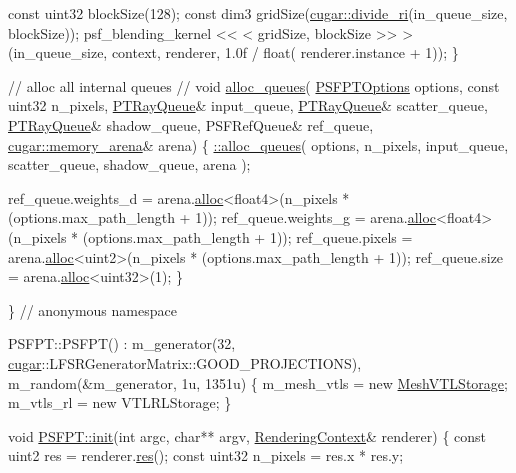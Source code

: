 \begin{DoxyCodeInclude}
        \textcolor{keyword}{const} uint32 blockSize(128);
        \textcolor{keyword}{const} dim3 gridSize(\hyperlink{group___basic_utils_gabb6714186dbbd864f0a9298944ba509b}{cugar::divide\_ri}(in\_queue\_size, blockSize));
        psf\_blending\_kernel << < gridSize, blockSize >> > (in\_queue\_size, context, renderer, 1.0f / float(
      renderer.instance + 1));
    \}

    \textcolor{comment}{// alloc all internal queues}
    \textcolor{comment}{//}
    \textcolor{keywordtype}{void} \hyperlink{group___p_t_lib_gaf8daef8b815f7712ff692edbaa628881}{alloc\_queues}(
        \hyperlink{struct_p_s_f_p_t_options}{PSFPTOptions}            options,
        \textcolor{keyword}{const} uint32            n\_pixels,
        \hyperlink{struct_p_t_ray_queue}{PTRayQueue}&               input\_queue,
        \hyperlink{struct_p_t_ray_queue}{PTRayQueue}&               scatter\_queue,
        \hyperlink{struct_p_t_ray_queue}{PTRayQueue}&               shadow\_queue,
        PSFRefQueue&            ref\_queue,
        \hyperlink{structcugar_1_1memory__arena}{cugar::memory\_arena}& arena)
    \{
        \hyperlink{group___p_t_lib_gaf8daef8b815f7712ff692edbaa628881}{::alloc\_queues}( options, n\_pixels, input\_queue, scatter\_queue, shadow\_queue, arena );

        ref\_queue.weights\_d     = arena.\hyperlink{structcugar_1_1memory__arena_afcbc6673ae3fa3e61368495ed2041621}{alloc}<float4>(n\_pixels * (options.max\_path\_length + 1));
        ref\_queue.weights\_g     = arena.\hyperlink{structcugar_1_1memory__arena_afcbc6673ae3fa3e61368495ed2041621}{alloc}<float4>(n\_pixels * (options.max\_path\_length + 1));
        ref\_queue.pixels        = arena.\hyperlink{structcugar_1_1memory__arena_afcbc6673ae3fa3e61368495ed2041621}{alloc}<uint2>(n\_pixels * (options.max\_path\_length + 1));
        ref\_queue.size          = arena.\hyperlink{structcugar_1_1memory__arena_afcbc6673ae3fa3e61368495ed2041621}{alloc}<uint32>(1);
    \}

\} \textcolor{comment}{// anonymous namespace}

PSFPT::PSFPT() :
    m\_generator(32, \hyperlink{namespacecugar}{cugar}::LFSRGeneratorMatrix::GOOD\_PROJECTIONS),
    m\_random(&m\_generator, 1u, 1351u)
\{
    m\_mesh\_vtls = \textcolor{keyword}{new} \hyperlink{struct_mesh_v_t_l_storage}{MeshVTLStorage};
    m\_vtls\_rl = \textcolor{keyword}{new} VTLRLStorage;
\}

\textcolor{keywordtype}{void} \hyperlink{struct_p_s_f_p_t_ad44f7f2769bcae6881eebf04a99f57ef}{PSFPT::init}(\textcolor{keywordtype}{int} argc, \textcolor{keywordtype}{char}** argv, \hyperlink{struct_rendering_context}{RenderingContext}& renderer)
\{
    \textcolor{keyword}{const} uint2 res = renderer.\hyperlink{struct_rendering_context_ad1a58510bdaf6f373080835abf5db2db}{res}();
    \textcolor{keyword}{const} uint32 n\_pixels = res.x * res.y;


\end{DoxyCodeInclude}
